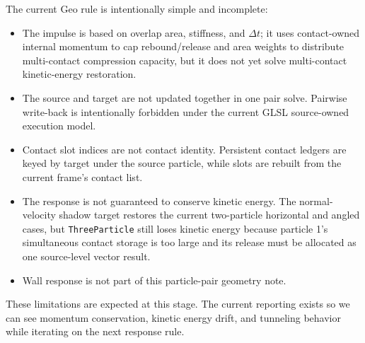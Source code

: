 The current Geo rule is intentionally simple and incomplete:

\begin{itemize}[leftmargin=*]
    \item The impulse is based on overlap area, stiffness, and $\Delta t$; it
    uses contact-owned internal momentum to cap rebound/release and area
    weights to distribute multi-contact compression capacity, but it does not
    yet solve multi-contact kinetic-energy restoration.
    \item The source and target are not updated together in one pair solve.
    Pairwise write-back is intentionally forbidden under the current GLSL
    source-owned execution model.
    \item Contact slot indices are not contact identity.  Persistent contact
    ledgers are keyed by target under the source particle, while slots are
    rebuilt from the current frame's contact list.
    \item The response is not guaranteed to conserve kinetic energy.
    The normal-velocity shadow target restores the current two-particle
    horizontal and angled cases, but \texttt{ThreeParticle} still loses kinetic
    energy because particle 1's simultaneous contact storage is too large and
    its release must be allocated as one source-level vector result.
    \item Wall response is not part of this particle-pair geometry note.
\end{itemize}

These limitations are expected at this stage.  The current reporting exists so
we can see momentum conservation, kinetic energy drift, and tunneling behavior
while iterating on the next response rule.
